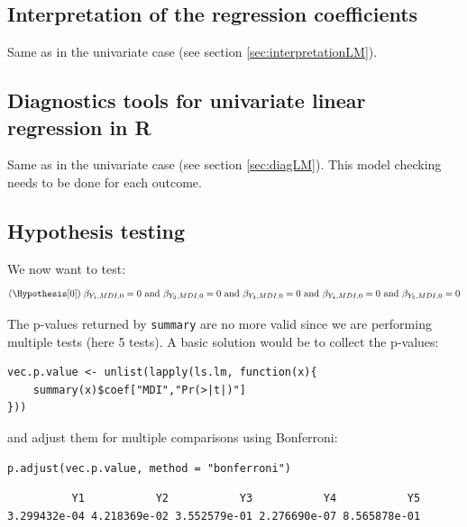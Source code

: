 \documentclass{article}
\newcommand\Rlogo{\textbf{\textsf{R}}}
\begin{document}
\subsection{Interpretation of the regression coefficients}
\label{sec:org9c45684}

Same as in the univariate case (see section \ref{sec:interpretationLM}).

\subsection{Diagnostics tools for univariate linear regression in \Rlogo{}}
\label{sec:orgfe1e600}

Same as in the univariate case (see section \ref{sec:diagLM}). This model
checking needs to be done for each outcome.

\subsection{Hypothesis testing}
\label{sec:org1e0c170}

We now want to test:
\begin{align*}
(\Hypothesis[0]) \; \beta_{Y_1, MDI, 0} = 0
 \text{ and } \beta_{Y_2, MDI, 0} = 0
 \text{ and } \beta_{Y_3, MDI, 0} = 0
 \text{ and } \beta_{Y_4, MDI, 0} = 0
 \text{ and } \beta_{Y_5, MDI, 0} = 0
\end{align*}

The p-values returned by \texttt{summary} are no more valid since we are
performing multiple tests (here 5 tests). A basic solution would be to
collect the p-values:
\lstset{language=r,label= ,caption= ,captionpos=b,numbers=none}
\begin{lstlisting}
vec.p.value <- unlist(lapply(ls.lm, function(x){
	summary(x)$coef["MDI","Pr(>|t|)"]
}))
\end{lstlisting}

\clearpage

and adjust them for multiple comparisons using Bonferroni:
\lstset{language=r,label= ,caption= ,captionpos=b,numbers=none}
\begin{lstlisting}
p.adjust(vec.p.value, method = "bonferroni")
\end{lstlisting}

\begin{verbatim}
          Y1           Y2           Y3           Y4           Y5 
3.299432e-04 4.218369e-02 3.552579e-01 2.276690e-07 8.565878e-01
\end{verbatim}
\end{document}
